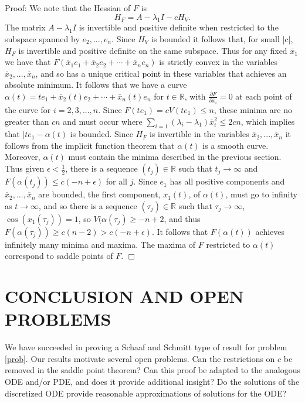 \documentclass[twoside]{article}
\newcommand{\R}{{\mathbb R}}
\begin{document}
Proof:
We note that the Hessian of $F$ is
\[
H_F=A-\lambda_1 I-cH_V.
\]
The matrix $A-\lambda_1 I$ is invertible and positive definite when restricted to the subspace spanned by $e_2,...,e_n$. Since $H_V$ is bounded it follows that, for small |c|, $H_F$ is invertible and positive definite on the same subspace. Thus for any fixed $\overline{x}_1$ we have that $F(\overline{x}_1e_1+\overline{x}_2 e_2+\cdots +\overline{x}_n e_n)$ is strictly convex in the variables $\overline{x}_2,...,\overline{x}_n$, and so has a unique critical point in these variables that achieves an absolute minimum. It follows that we have a curve $\alpha (t)=te_1+\overline{x}_2(t)e_2+\cdots+\overline{x}_n(t)e_n$ for $t\in\R$, with $\frac{\partial F}{\partial\overline{x}_i}=0$ at each point of the curve for $i=2,3,...,n$. Since $F(te_1)=cV(te_1)\leq n$, these minima are no greater than $cn$ and must occur where $\sum_{i=1}(\lambda_i-\lambda_1)\overline{x}_i^2\leq 2cn$, which implies that $|te_1-\alpha(t)$ is bounded.  Since $H_F$ is invertible in the variables $\overline{x}_2,...,\overline{x}_n$ it follows from the implicit function theorem that $\alpha(t)$ is a smooth curve. Moreover, $\alpha(t)$ must contain the minima described in the previous section. Thus given $\epsilon<\frac{1}{2}$, there is a sequence $(t_j)\in\R$ such that $t_j\rightarrow\infty$ and $F(\alpha(t_j))\leq c(-n+\epsilon)$ for all $j$. Since $e_1$ has all positive components and $\overline{x}_2,...,\overline{x}_n$ are bounded, the first component, $x_1(t)$, of $\alpha(t)$, must go to infinity as $t\rightarrow\infty$, and so there is a sequence $(\tau_j)\in\R$ such that $\tau_j\rightarrow\infty$, $\cos(x_1(\tau_j))=1$, so $V(\alpha(\tau_j)\geq -n+2$, and thus $F(\alpha(\tau_j))\geq c( n-2)>c(-n+\epsilon)$. It follows that $F(\alpha(t))$ achieves infinitely many minima and maxima. The maxima of $F$ restricted to $\alpha(t)$ correspond to saddle points of $F$. $\Box$

\section{CONCLUSION AND OPEN PROBLEMS}

We have succeeded in proving a Schaaf and Schmitt type of result for problem \eqref{prob}. Our results motivate several open problems. Can the restrictions on $c$ be removed in the saddle point theorem? Can this proof be adapted to the analogous ODE and/or PDE, and does it provide additional insight? Do the solutions of the discretized ODE provide reasonable approximations of solutions for the ODE?
\end{document}
